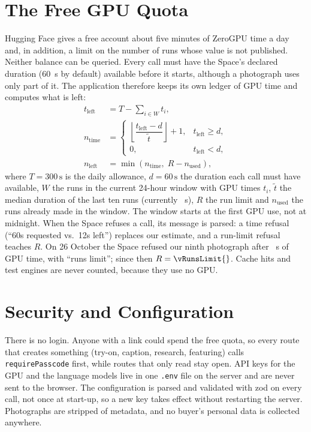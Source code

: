\section{The Free GPU Quota}

Hugging Face gives a free account about five minutes of ZeroGPU time a day~\cite{zerogpu} and, in addition, a limit on the number of runs whose value is not published. Neither balance can be queried. Every call must have the Space's declared duration (60~s by default) available before it starts, although a photograph uses only part of it. The application therefore keeps its own ledger of GPU time and computes what is left:
\begin{align}
t_\text{left} &= T - \sum_{i \in W} t_i , \label{eq:tleft}\\[4pt]
n_\text{time} &=
  \begin{cases}
    \left\lfloor \dfrac{t_\text{left} - d}{\tilde{t}} \right\rfloor + 1, & t_\text{left} \ge d, \\[8pt]
    0, & t_\text{left} < d,
  \end{cases} \label{eq:ntime}\\[4pt]
n_\text{left} &= \min\left(n_\text{time},\; R - n_\text{used}\right), \label{eq:nleft}
\end{align}
where $T = 300\,\text{s}$ is the daily allowance, $d = 60\,\text{s}$ the duration each call must have available, $W$ the runs in the current 24-hour window with GPU times $t_i$, $\tilde{t}$ the median duration of the last ten runs (currently \vPerPhoto{}~s), $R$ the run limit and $n_\text{used}$ the runs already made in the window. The window starts at the first GPU use, not at midnight. When the Space refuses a call, its message is parsed: a time refusal (``60s requested vs.\ 12s left'') replaces our estimate, and a run-limit refusal teaches $R$. On 26 October the Space refused our ninth photograph after \vUsedAtRefusal{}~s of GPU time, with ``runs limit''; since then $R = \vRunsLimit{}$. Cache hits and test engines are never counted, because they use no GPU.

\section{Security and Configuration}

There is no login. Anyone with a link could spend the free quota, so every route that creates something (try-on, caption, research, featuring) calls \texttt{requirePasscode} first, while routes that only read stay open. API keys for the GPU and the language models live in one \texttt{.env} file on the server and are never sent to the browser. The configuration is parsed and validated with zod on every call, not once at start-up, so a new key takes effect without restarting the server. Photographs are stripped of metadata, and no buyer's personal data is collected anywhere.

